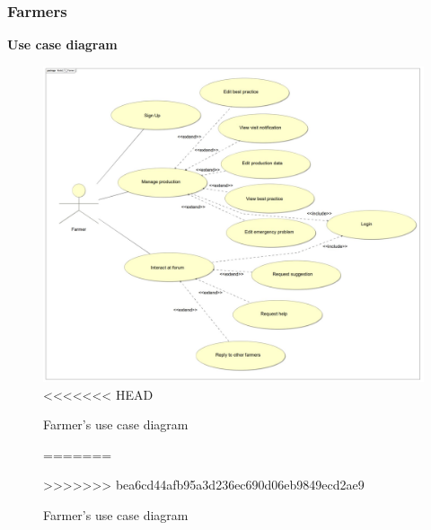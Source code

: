 \subsubsection{Farmers}
\textbf{\textcolor{myblue}{Use case diagram}}
\begin{figure}[H]
	\centering
    \includegraphics[page=1, width=\textwidth]{Images/ud_fa.JPG}
<<<<<<< HEAD
	\caption{\label{fig:f_use_case_diagram}Farmer's use case diagram}
=======
	\caption{\label{fig:use_case_diagram}Farmer's use case diagram}
>>>>>>> bea6cd44afb95a3d236ec690d06eb9849ecd2ae9
\end{figure}
\label{sect:farmer_requirements}


